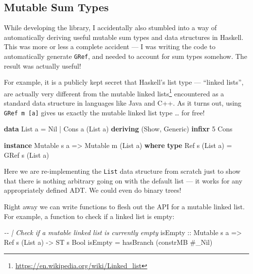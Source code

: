 \documentclass[]{article}
\newenvironment{Shaded}{}{}
\newcommand{\CommentTok}[1]{\textcolor[rgb]{0.38,0.63,0.69}{\textit{#1}}}
\newcommand{\DataTypeTok}[1]{\textcolor[rgb]{0.56,0.13,0.00}{#1}}
\newcommand{\DecValTok}[1]{\textcolor[rgb]{0.25,0.63,0.44}{#1}}
\newcommand{\KeywordTok}[1]{\textcolor[rgb]{0.00,0.44,0.13}{\textbf{#1}}}
\newcommand{\NormalTok}[1]{#1}
\newcommand{\OperatorTok}[1]{\textcolor[rgb]{0.40,0.40,0.40}{#1}}
\newcommand{\OtherTok}[1]{\textcolor[rgb]{0.00,0.44,0.13}{#1}}
\renewcommand{\href}[2]{#2\footnote{\url{#1}}}
\begin{document}
\hypertarget{mutable-sum-types}{%
\subsection{Mutable Sum Types}\label{mutable-sum-types}}

While developing the library, I accidentally also stumbled into a way of
automatically deriving useful mutable sum types and data structures in Haskell.
This was more or less a complete accident --- I was writing the code to
automatically generate \texttt{GRef}, and needed to account for sum types
somehow. The result was actually useful!

For example, it is a publicly kept secret that Haskell's list type --- ``linked
lists'', are actually very different from the
\href{https://en.wikipedia.org/wiki/Linked_list}{mutable linked lists}
encountered as a standard data structure in languages like Java and C++. As it
turns out, using \texttt{GRef\ m\ {[}a{]}} gives us exactly the mutable linked
list type \ldots{} for free!

\begin{Shaded}
\begin{Highlighting}[]
\KeywordTok{data} \DataTypeTok{List}\NormalTok{ a }\OtherTok{=} \DataTypeTok{Nil} \OperatorTok{|} \DataTypeTok{Cons}\NormalTok{ a (}\DataTypeTok{List}\NormalTok{ a)}
  \KeywordTok{deriving}\NormalTok{ (}\DataTypeTok{Show}\NormalTok{, }\DataTypeTok{Generic}\NormalTok{)}
\KeywordTok{infixr} \DecValTok{5} \OtherTok{\textasciigrave{}Cons\textasciigrave{}}

\KeywordTok{instance} \DataTypeTok{Mutable}\NormalTok{ s a }\OtherTok{=>} \DataTypeTok{Mutable}\NormalTok{ m (}\DataTypeTok{List}\NormalTok{ a) }\KeywordTok{where}
    \KeywordTok{type} \DataTypeTok{Ref}\NormalTok{ s (}\DataTypeTok{List}\NormalTok{ a) }\OtherTok{=} \DataTypeTok{GRef}\NormalTok{ s (}\DataTypeTok{List}\NormalTok{ a)}
\end{Highlighting}
\end{Shaded}

Here we are re-implementing the \texttt{List} data structure from scratch just
to show that there is nothing arbitrary going on with the default list --- it
works for any appropriately defined ADT. We could even do binary trees!

Right away we can write functions to flesh out the API for a mutable linked
list. For example, a function to check if a linked list is empty:

\begin{Shaded}
\begin{Highlighting}[]
\CommentTok{{-}{-} | Check if a mutable linked list is currently empty}
\NormalTok{isEmpty}
\OtherTok{    ::} \DataTypeTok{Mutable}\NormalTok{ s a}
    \OtherTok{=>} \DataTypeTok{Ref}\NormalTok{ s (}\DataTypeTok{List}\NormalTok{ a)}
    \OtherTok{{-}>} \DataTypeTok{ST}\NormalTok{ s }\DataTypeTok{Bool}
\NormalTok{isEmpty }\OtherTok{=}\NormalTok{ hasBranch (constrMB }\OperatorTok{\#}\NormalTok{\_Nil)}
\end{Highlighting}
\end{Shaded}
\end{document}
